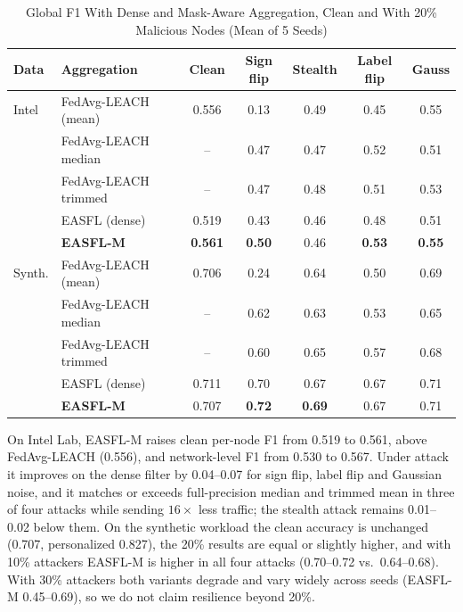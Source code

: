 \documentclass[journal]{IEEEtran}
\begin{document}
\begin{table}[t]
\caption{Global F1 With Dense and Mask-Aware Aggregation, Clean and With 20\% Malicious Nodes (Mean of 5 Seeds)}\label{tab:mask}
\centering\scriptsize\setlength{\tabcolsep}{3pt}
\begin{tabular}{@{}llccccc@{}}
\toprule
Data & Aggregation & Clean & Sign flip & Stealth & Label flip & Gauss\\
\midrule
Intel & FedAvg-LEACH (mean) & 0.556 & 0.13 & 0.49 & 0.45 & 0.55\\
 & FedAvg-LEACH median & -- & 0.47 & 0.47 & 0.52 & 0.51\\
 & FedAvg-LEACH trimmed & -- & 0.47 & 0.48 & 0.51 & 0.53\\
 & EASFL (dense) & 0.519 & 0.43 & 0.46 & 0.48 & 0.51\\
 & \textbf{EASFL-M} & \textbf{0.561} & \textbf{0.50} & 0.46 & \textbf{0.53} & \textbf{0.55}\\
\midrule
Synth. & FedAvg-LEACH (mean) & 0.706 & 0.24 & 0.64 & 0.50 & 0.69\\
 & FedAvg-LEACH median & -- & 0.62 & 0.63 & 0.53 & 0.65\\
 & FedAvg-LEACH trimmed & -- & 0.60 & 0.65 & 0.57 & 0.68\\
 & EASFL (dense) & 0.711 & 0.70 & 0.67 & 0.67 & 0.71\\
 & \textbf{EASFL-M} & 0.707 & \textbf{0.72} & \textbf{0.69} & 0.67 & 0.71\\
\bottomrule
\end{tabular}
\end{table}

On Intel Lab, EASFL-M raises clean per-node F1 from 0.519 to 0.561, above FedAvg-LEACH (0.556), and network-level F1 from 0.530 to 0.567. Under attack it improves on the dense filter by 0.04--0.07 for sign flip, label flip and Gaussian noise, and it matches or exceeds full-precision median and trimmed mean in three of four attacks while sending $16\times$ less traffic; the stealth attack remains 0.01--0.02 below them. On the synthetic workload the clean accuracy is unchanged (0.707, personalized 0.827), the 20\% results are equal or slightly higher, and with 10\% attackers EASFL-M is higher in all four attacks (0.70--0.72 vs.\ 0.64--0.68). With 30\% attackers both variants degrade and vary widely across seeds (EASFL-M 0.45--0.69), so we do not claim resilience beyond 20\%.
\end{document}
